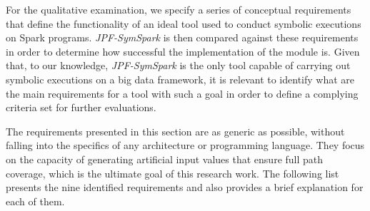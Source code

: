 \label{sec:qualitative}

For the qualitative examination, we specify a series of conceptual requirements that define the functionality of an ideal tool used to conduct symbolic executions on Spark programs. \textit{JPF-SymSpark} is then compared against these requirements in order to determine how successful the implementation of the module is. Given that, to our knowledge, \textit{JPF-SymSpark} is the only tool capable of carrying out symbolic executions on a big data framework, it is relevant to identify what are the main requirements for a tool with such a goal in order to define a complying criteria set for further evaluations.

The requirements presented in this section are as generic as possible, without falling into the specifics of any architecture or programming language. They focus on the capacity of generating artificial input values that ensure full path coverage, which is the ultimate goal of this research work. The following list presents the nine identified requirements and also provides a brief explanation for each of them. 

\label{sec:requirement}

